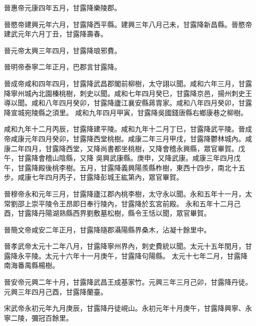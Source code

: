 \begin{pinyinscope}
 晉惠帝元康四年五月，甘露降樂陵郡。



 晉愍帝建興元年六月，甘露降西平縣。建興三年八月己未，甘露降新昌縣。晉愍帝建武元年六月丁丑，甘露降壽春。



 晉元帝太興三年四月，甘露降琅邪費。



 晉明帝泰寧二年正月，巴郡言甘露降。



 晉成帝咸和四年四月，甘露降武昌郡閣前柳樹，太守詡以聞。咸和六年三月，甘露降寧州城內北園榛桃樹，刺史以聞。咸和七年四月癸巳，甘露降京邑，揚州刺史王導以聞。咸和八年四月癸卯，甘露降廬江襄安縣蔣胄家。咸和八年四月癸卯，甘露降宣城宛陵縣之須里。
 咸和九年四月甲寅，甘露降吳國錢唐縣右鄉康巷之柳樹。



 咸和九年十二月丙辰，甘露降建平陵。咸和九年十二月丁巳，甘露降武平陵。晉成帝咸康元年四月癸卯，甘露降西堂桃樹。咸康二年三月甲戌，甘露降鬱林城內。咸康二年四月，甘露降西堂，又降尚書都坐桃樹，又降會稽永興縣，眾官畢賀。戊午，甘露降會稽山陰縣，又降
 吳興武康縣。庚申，又降武康。咸康三年四月戊午，甘露降殿後桃李樹。五月，甘露降義興陽羨縣柞樹，東西十四步，南北十五步。咸康七年四月丙子，甘露降彭城王紘第內，眾官畢賀。



 晉穆帝永和元年三月，甘露降廬江郡內桃李樹，太守永以聞。永和五年十一月，太常劉邵上崇平陵令王昂即日奉行陵內，甘露降於玄宮前殿。
 永和五年十二月己酉，甘露降丹陽湖熟縣西界劉敷墓松樹，縣令王恬以聞，眾官畢賀。



 晉簡文帝咸安二年正月，甘露降隨郡灄陽縣界桑木，沾凝十餘里中。



 晉孝武帝太元十二年八月，甘露降寧州界內，刺史費統以聞。太元十五年閏月，甘露降永平陵。太元十六年十一月庚午，甘露降句陽縣。
 太元十七年二月，甘露降南海番禺縣楊樹。



 晉安帝元興二年十月，甘露降武昌王成基家竹。元興三年三月己卯，甘露降丹徒。元興三年四月己酉，甘露降蘭臺。



 宋武帝永初元年九月庚辰，甘露降丹徒峴山。永初元年十月庚午，甘露降興寧、永寧二陵，彌冠百餘里。




\end{pinyinscope}
